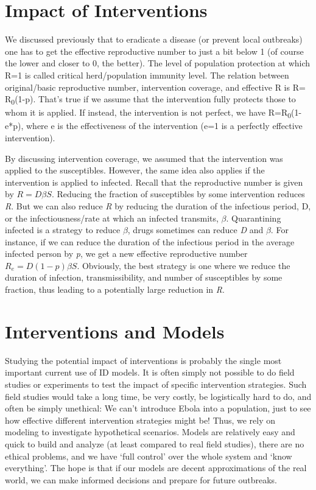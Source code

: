 \documentclass[]{book}
\theoremstyle{definition}
\theoremstyle{definition}
\theoremstyle{definition}
\theoremstyle{remark}
\begin{document}
\section{Impact of Interventions}\label{impact-of-interventions}

We discussed previously that to eradicate a disease (or prevent local
outbreaks) one has to get the effective reproductive number to just a
bit below 1 (of course the lower and closer to 0, the better). The level
of population protection at which R=1 is called critical herd/population
immunity level. The relation between original/basic reproductive number,
intervention coverage, and effective R is R= R\textsubscript{0}(1-p).
That's true if we assume that the intervention fully protects those to
whom it is applied. If instead, the intervention is not perfect, we have
R=R\textsubscript{0}(1-e*p), where e is the effectiveness of the
intervention (e=1 is a perfectly effective intervention).

By discussing intervention coverage, we assumed that the intervention
was applied to the susceptibles. However, the same idea also applies if
the intervention is applied to infected. Recall that the reproductive
number is given by \(R = D \beta S\). Reducing the fraction of
susceptibles by some intervention reduces \emph{R}. But we can also
reduce \emph{R} by reducing the duration of the infectious period, D, or
the infectiousness/rate at which an infected transmits, \(\beta\).
Quarantining infected is a strategy to reduce \(\beta\), drugs sometimes
can reduce \emph{D} and \(\beta\). For instance, if we can reduce the
duration of the infectious period in the average infected person by
\emph{p}, we get a new effective reproductive number
\(R_{e} = D(1-p) \beta S\). Obviously, the best strategy is one where we
reduce the duration of infection, transmissibility, and number of
susceptibles by some fraction, thus leading to a potentially large
reduction in \emph{R}.

\section{Interventions and Models}\label{interventions-and-models}

Studying the potential impact of interventions is probably the single
most important current use of ID models. It is often simply not possible
to do field studies or experiments to test the impact of specific
intervention strategies. Such field studies would take a long time, be
very costly, be logistically hard to do, and often be simply unethical:
We can't introduce Ebola into a population, just to see how effective
different intervention strategies might be! Thus, we rely on modeling to
investigate hypothetical scenarios. Models are relatively easy and quick
to build and analyze (at least compared to real field studies), there
are no ethical problems, and we have `full control' over the whole
system and `know everything'. The hope is that if our models are decent
approximations of the real world, we can make informed decisions and
prepare for future outbreaks.
\end{document}
